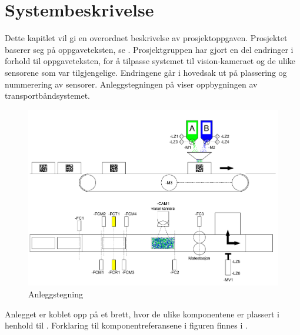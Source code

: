 \documentclass[Visionprosjekt.tex]{subfiles}
\begin{document}
 
  
\section{Systembeskrivelse}
\label{sec:systembeskrivelse}

Dette kapitlet vil gi en overordnet beskrivelse av prosjektoppgaven.
Prosjektet baserer seg på oppgaveteksten, se . Prosjektgruppen har gjort en del endringer i forhold til oppgaveteksten, for å tilpasse systemet til vision-kameraet og de ulike sensorene som var tilgjengelige. Endringene går i hovedsak ut på plassering og nummerering av sensorer.  Anleggstegningen på 
 viser oppbygningen av  transportbåndsystemet.


\begin{figure}[ht]
	\centering
		\includegraphics[width=\textwidth]{bilder/system2.pdf}
	\caption{Anleggstegning}
	\label{fig:systemfigur2}
\end{figure}


%


Anlegget er koblet opp på et brett, hvor de ulike komponentene er plassert i henhold til . Forklaring til komponentreferansene i figuren finnes i .
\end{document}
